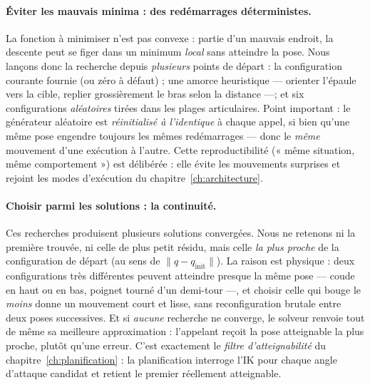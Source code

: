 \paragraph{Éviter les mauvais minima : des redémarrages déterministes.} La fonction à minimiser n'est pas convexe : partie d'un mauvais endroit, la descente peut se figer dans un minimum \emph{local} sans atteindre la pose. Nous lançons donc la recherche depuis \emph{plusieurs} points de départ : la configuration courante fournie (ou zéro à défaut) ; une amorce heuristique --- orienter l'épaule vers la cible, replier grossièrement le bras selon la distance ---; et six configurations \emph{aléatoires} tirées dans les plages articulaires. Point important : le générateur aléatoire est \emph{réinitialisé à l'identique} à chaque appel, si bien qu'une même pose engendre toujours les mêmes redémarrages --- donc le \emph{même} mouvement d'une exécution à l'autre. Cette reproductibilité (« même situation, même comportement ») est délibérée : elle évite les mouvements surprises et rejoint les modes d'exécution du chapitre~\ref{ch:architecture}.

\paragraph{Choisir parmi les solutions : la continuité.} Ces recherches produisent plusieurs solutions convergées. Nous ne retenons ni la première trouvée, ni celle de plus petit résidu, mais celle \emph{la plus proche} de la configuration de départ (au sens de $\lVert q - q_{\text{init}} \rVert$). La raison est physique : deux configurations très différentes peuvent atteindre presque la même pose --- coude en haut ou en bas, poignet tourné d'un demi-tour ---, et choisir celle qui bouge le \emph{moins} donne un mouvement court et lisse, sans reconfiguration brutale entre deux poses successives. Et si \emph{aucune} recherche ne converge, le solveur renvoie tout de même sa meilleure approximation : l'appelant reçoit la pose atteignable la plus proche, plutôt qu'une erreur. C'est exactement le \emph{filtre d'atteignabilité} du chapitre~\ref{ch:planification} : la planification interroge l'IK pour chaque angle d'attaque candidat et retient le premier réellement atteignable.

